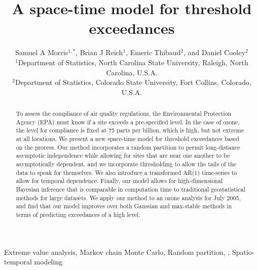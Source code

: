 \documentclass[useAMS,usenatbib,referee]{biom}
\title[A Space-time \Skewt Model for Threshold Exceedances]{A space-time \skewt model for threshold exceedances}
\author
{Samuel A Morris$^{1,*}$\email{samorris@ncsu.edu},
Brian J Reich$^{1}$,
Emeric Thibaud$^{2}$, and
Daniel Cooley$^{2}$\\
$^{1}$Department of Statistics, North Carolina State University, Raleigh, North Carolina, U.S.A. \\
$^{2}$Department of Statistics, Colorado State University, Fort Collins, Colorado, U.S.A.}
\begin{document}



\pagerange{\pageref{stfirstpage}--\pageref{stlastpage}}

\label{stfirstpage}

\begin{abstract}
To assess the compliance of air quality regulations, the Environmental Protection Agency (EPA) must know if a site exceeds a pre-specified level.
In the case of ozone, the level for compliance is fixed at 75 parts per billion, which is high, but not extreme at all locations.
We present a new space-time model for threshold exceedances based on the \skewt process.
Our method incorporates a random partition to permit long-distance asymptotic independence while allowing for sites that are near one another to be asymptotically dependent, and we incorporate thresholding to allow the tails of the data to speak for themselves.
We also introduce a transformed AR(1) time-series to allow for temporal dependence.
Finally, our model allows for high-dimensional Bayesian inference that is comparable in computation time to traditional geostatistical methods for large datasets.
We apply our method to an ozone analysis for July 2005, and find that our model improves over both Gaussian and max-stable methods in terms of predicting exceedances of a high level.
\end{abstract}

\begin{keywords}
Extreme value analysis, Markov chain Monte Carlo, Random partition, \Skewt, Spatio-temporal modeling
\end{keywords}

\maketitle
\end{document}
